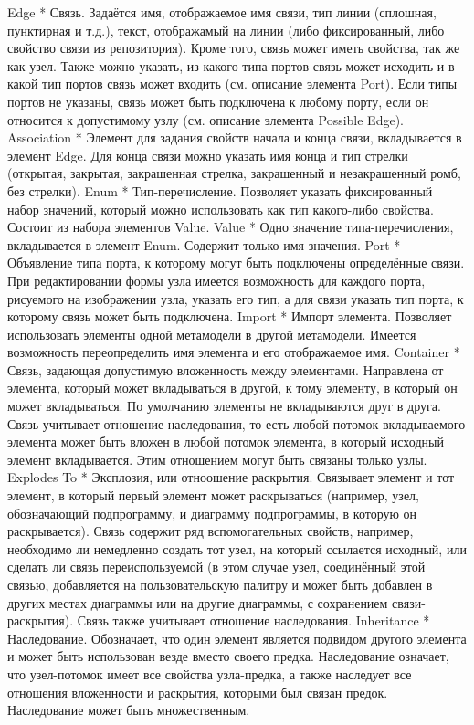 Edge
*
Связь. Задаётся имя, отображаемое имя связи, тип линии (сплошная, пунктирная и т.д.), текст, отображамый на линии (либо фиксированный, либо свойство связи из репозитория). Кроме того, связь может иметь свойства, так же как узел. Также можно указать, из какого типа портов связь может исходить и в какой тип портов связь может входить (см. описание элемента Port). Если типы портов не указаны, связь может быть подключена к любому порту, если он относится к допустимому узлу (см. описание элемента Possible Edge).
Association
*
Элемент для задания свойств начала и конца связи, вкладывается в элемент Edge. Для конца связи можно указать имя конца и тип стрелки (открытая, закрытая, закрашенная стрелка, закрашенный и незакрашенный ромб, без стрелки).
Enum
*
Тип-перечисление. Позволяет указать фиксированный набор значений, который можно использовать как тип какого-либо свойства. Состоит из набора элементов Value.
Value
*
Одно значение типа-перечисления, вкладывается в элемент Enum. Содержит только имя значения.
Port
*
Объявление типа порта, к которому могут быть подключены определённые связи. При редактировании формы узла имеется возможность для каждого порта, рисуемого на изображении узла, указать его тип, а для связи указать тип порта, к которому связь может быть подключена. 
Import
*
Импорт элемента. Позволяет использовать элементы одной метамодели в другой метамодели. Имеется возможность переопределить имя элемента и его отображаемое имя.
Container
*
Связь, задающая допустимую вложенность между элементами. Направлена от элемента, который может вкладываться в другой, к тому элементу, в который он может вкладываться. По умолчанию элементы не вкладываются друг в друга. Связь учитывает отношение наследования, то есть любой потомок вкладываемого элемента может быть вложен в любой потомок элемента, в который исходный элемент вкладывается. Этим отношением могут быть связаны только узлы.
Explodes To
*
Эксплозия, или отноошение раскрытия. Связывает элемент и тот элемент, в который первый элемент может раскрываться (например, узел, обозначающий подпрограмму, и диаграмму подпрограммы, в которую он раскрывается). Связь содержит ряд вспомогательных свойств, например, необходимо ли немедленно создать тот узел, на который ссылается исходный, или сделать ли связь переиспользуемой (в этом случае узел, соединённый этой связью, добавляется на пользовательскую палитру и может быть добавлен в других местах диаграммы или на другие диаграммы, с сохранением связи-раскрытия). Связь также учитывает отношение наследования.
Inheritance
*
Наследование. Обозначает, что один элемент является подвидом другого элемента и может быть использован везде вместо своего предка. Наследование означает, что узел-потомок имеет все свойства узла-предка, а также наследует все отношения вложенности и раскрытия, которыми был связан предок. Наследование может быть множественным.


